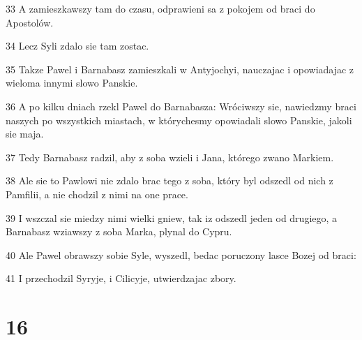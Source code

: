 \par 33 A zamieszkawszy tam do czasu, odprawieni sa z pokojem od braci do Apostolów.
\par 34 Lecz Syli zdalo sie tam zostac.
\par 35 Takze Pawel i Barnabasz zamieszkali w Antyjochyi, nauczajac i opowiadajac z wieloma innymi slowo Panskie.
\par 36 A po kilku dniach rzekl Pawel do Barnabasza: Wróciwszy sie, nawiedzmy braci naszych po wszystkich miastach, w którychesmy opowiadali slowo Panskie, jakoli sie maja.
\par 37 Tedy Barnabasz radzil, aby z soba wzieli i Jana, którego zwano Markiem.
\par 38 Ale sie to Pawlowi nie zdalo brac tego z soba, który byl odszedl od nich z Pamfilii, a nie chodzil z nimi na one prace.
\par 39 I wszczal sie miedzy nimi wielki gniew, tak iz odszedl jeden od drugiego, a Barnabasz wziawszy z soba Marka, plynal do Cypru.
\par 40 Ale Pawel obrawszy sobie Syle, wyszedl, bedac poruczony lasce Bozej od braci:
\par 41 I przechodzil Syryje, i Cilicyje, utwierdzajac zbory.

\chapter{16}

